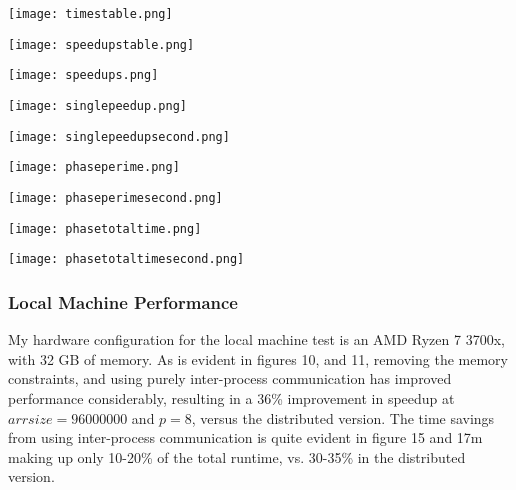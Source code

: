 \documentclass[11pt]{report}
\newcommand{\SCALE}{0.5}
\begin{document}
\begin{minipage}{\SCALE\linewidth}
\texttt{[image: timestable.png]}
\end{minipage}
\hfill
\begin{minipage}{\SCALE\linewidth}
\texttt{[image: speedupstable.png]}
\end{minipage}

\begin{minipage}{\SCALE\linewidth}
\texttt{[image: speedups.png]}
\end{minipage}
\hfill
\begin{minipage}{\SCALE\linewidth}
\texttt{[image: singlepeedup.png]}
\end{minipage}

\begin{minipage}{\SCALE\linewidth}
\texttt{[image: singlepeedupsecond.png]}
\end{minipage}

\begin{minipage}{\SCALE\linewidth}
\texttt{[image: phaseperime.png]}
\end{minipage}
\hfill
\begin{minipage}{\SCALE\linewidth}
\texttt{[image: phaseperimesecond.png]}
\end{minipage}

\begin{minipage}{\SCALE\linewidth}
\texttt{[image: phasetotaltime.png]}
\end{minipage}
\hfill
\begin{minipage}{\SCALE\linewidth}
\texttt{[image: phasetotaltimesecond.png]}
\end{minipage}


\subsubsection*{Local Machine Performance}
My hardware configuration for the local machine test is an AMD Ryzen 7 3700x, with 32 GB of memory. As is evident in figures 10, and 11, removing the memory constraints, and 
using purely inter-process communication has improved performance considerably, resulting in a
36\% improvement in speedup at $arrsize=96000000$ and $p=8$, versus the distributed version. The time savings from using inter-process communication is quite evident in figure 15 and 17m making up only 10-20\% of the total runtime, vs. 30-35\% in the distributed version.
\end{document}
